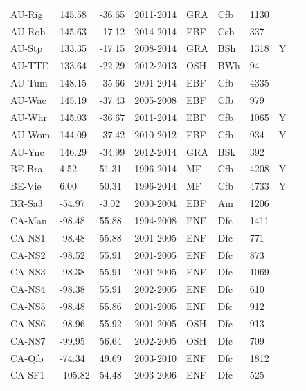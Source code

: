 \documentclass[gmd, manuscript]{copernicus}
\begin{document}
\begin{table}
\begin{tabular}{lllllllll}
  AU-Rig & 145.58 & -36.65 & 2011-2014 & GRA & Cfb & 1130 &  & \citet{AU-Rig} \\ 
  AU-Rob & 145.63 & -17.12 & 2014-2014 & EBF & Csb & 337 &  & \citet{AU-Rob} \\ 
  AU-Stp & 133.35 & -17.15 & 2008-2014 & GRA & BSh & 1318 & Y & \citet{AU-Stp} \\ 
  AU-TTE & 133.64 & -22.29 & 2012-2013 & OSH & BWh &  94 &  & \citet{AU-TTE} \\ 
  AU-Tum & 148.15 & -35.66 & 2001-2014 & EBF & Cfb & 4335 &  & \citet{AU-Tum} \\ 
  AU-Wac & 145.19 & -37.43 & 2005-2008 & EBF & Cfb & 979 &  & \citet{AU-Wac} \\ 
  AU-Whr & 145.03 & -36.67 & 2011-2014 & EBF & Cfb & 1065 & Y & \citet{AU-Whr} \\ 
  AU-Wom & 144.09 & -37.42 & 2010-2012 & EBF & Cfb & 934 & Y & \citet{AU-Wom} \\ 
  AU-Ync & 146.29 & -34.99 & 2012-2014 & GRA & BSk & 392 &  & \citet{AU-Ync} \\ 
  BE-Bra & 4.52 & 51.31 & 1996-2014 & MF & Cfb & 4208 & Y & \citet{BE-Bra} \\ 
  BE-Vie & 6.00 & 50.31 & 1996-2014 & MF & Cfb & 4733 & Y & \citet{BE-Vie} \\ 
  BR-Sa3 & -54.97 & -3.02 & 2000-2004 & EBF & Am & 1206 &  & \citet{BR-Sa3} \\ 
  CA-Man & -98.48 & 55.88 & 1994-2008 & ENF & Dfc & 1411 &  & \citet{CA-Man} \\ 
  CA-NS1 & -98.48 & 55.88 & 2001-2005 & ENF & Dfc & 771 &  & \citet{CA-NS1} \\ 
  CA-NS2 & -98.52 & 55.91 & 2001-2005 & ENF & Dfc & 873 &  & \citet{CA-NS2} \\ 
  CA-NS3 & -98.38 & 55.91 & 2001-2005 & ENF & Dfc & 1069 &  & \citet{CA-NS3} \\ 
  CA-NS4 & -98.38 & 55.91 & 2002-2005 & ENF & Dfc & 610 &  & \citet{CA-NS4} \\ 
  CA-NS5 & -98.48 & 55.86 & 2001-2005 & ENF & Dfc & 912 &  & \citet{CA-NS5} \\ 
  CA-NS6 & -98.96 & 55.92 & 2001-2005 & OSH & Dfc & 913 &  & \citet{CA-NS6} \\ 
  CA-NS7 & -99.95 & 56.64 & 2002-2005 & OSH & Dfc & 709 &  & \citet{CA-NS7} \\ 
  CA-Qfo & -74.34 & 49.69 & 2003-2010 & ENF & Dfc & 1812 &  & \citet{CA-Qfo} \\ 
  CA-SF1 & -105.82 & 54.48 & 2003-2006 & ENF & Dfc & 525 &  & \citet{CA-SF1} \\ 

\end{tabular}
\end{table}
\end{document}
